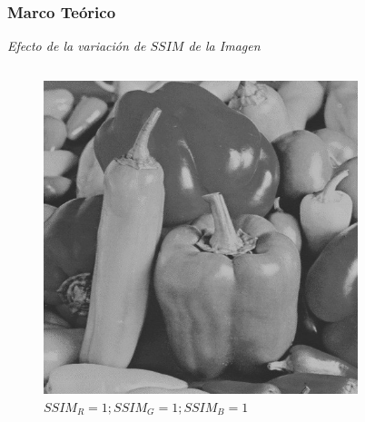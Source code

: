 \documentclass[usenames,dvipsnames]{beamer}
\begin{document}
\begin{frame} 
\frametitle{Marco Teórico} 
\begin{exampleblock}{\textit{Efecto de la variación de $SSIM$ de la Imagen}}

\end{exampleblock}
\centering
\begin{columns}[onlytextwidth]
\begin{column}{.45\textwidth}
\begin{figure}
  \includegraphics[width=\textwidth]{graphics/peppers_gray_lc.jpg}
  \caption{$SSIM_R=1 ; SSIM_G=1 ; SSIM_B=1$}
\end{figure}
\end{column}
\hfill
\begin{column}{.45\textwidth}
		\begin{figure}

\end{figure}
\end{column}
\end{columns}
\end{frame}
\end{document}
